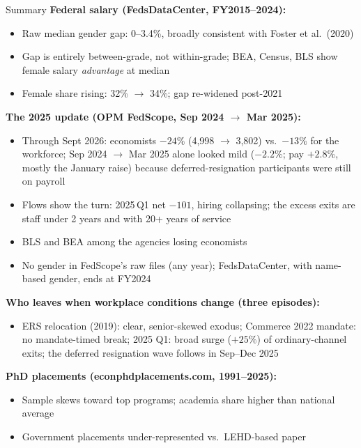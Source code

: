 \documentclass[aspectratio=169]{beamer}
\begin{document}
\begin{frame}[allowframebreaks]{Summary}
  \textbf{Federal salary (FedsDataCenter, FY2015--2024):}
  \begin{itemize}
    \item Raw median gender gap: 0--3.4\%, broadly consistent with Foster et al.\ (2020)
    \item Gap is entirely between-grade, not within-grade; BEA, Census, BLS show
          female salary \textit{advantage} at median
    \item Female share rising: 32\% $\to$ 34\%; gap re-widened post-2021
  \end{itemize}
  \vspace{0.4em}
  \textbf{The 2025 update (OPM FedScope, Sep 2024 $\to$ Mar 2025):}
  \begin{itemize}
    \item Through Sept 2026: economists $-24\%$ (4,998 $\to$ 3,802) vs.\ $-13\%$ for the
          workforce; Sep 2024 $\to$ Mar 2025 alone looked mild ($-2.2\%$; pay $+2.8\%$, mostly
          the January raise) because deferred-resignation participants were still on payroll
    \item Flows show the turn: 2025\,Q1 net $-101$, hiring collapsing; the excess
          exits are staff under 2 years and with 20+ years of service
    \item BLS and BEA among the agencies losing economists
    \item No gender in FedScope's raw files (any year); FedsDataCenter, with
          name-based gender, ends at FY2024
  \end{itemize}
  \vspace{0.4em}
  \textbf{Who leaves when workplace conditions change (three episodes):}
  \begin{itemize}
    \item ERS relocation (2019): clear, senior-skewed exodus; Commerce 2022
          mandate: no mandate-timed break; 2025 Q1: broad surge ($+25\%$) of
          ordinary-channel exits; the deferred resignation wave follows in Sep--Dec 2025
  \end{itemize}
  \vspace{0.4em}
  \textbf{PhD placements (econphdplacements.com, 1991--2025):}
  \begin{itemize}
    \item Sample skews toward top programs; academia share higher than national average
    \item Government placements under-represented vs.\ LEHD-based paper

\end{itemize}
\end{frame}
\end{document}

